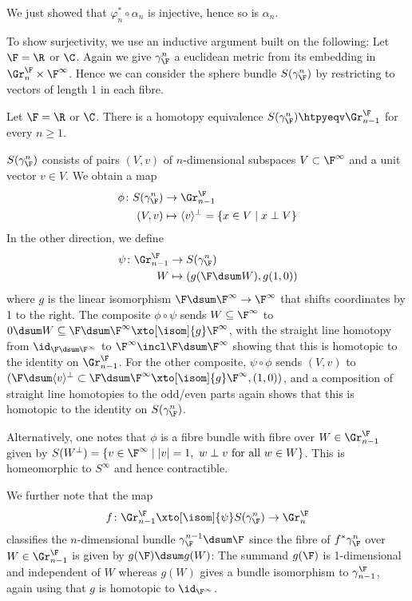\begin{smallproof}
	We just showed that $\varphi_n^* \circ \alpha_n$ is injective, hence so is $\alpha_n$.
\end{smallproof}
To show surjectivity, we use an inductive argument built on the following:
Let $\F = \R$ or $\C$.
Again we give $\gamma_\F^n$ a euclidean metric from its embedding in $\Gr_n^\F \times \F^\infty$.
Hence we can consider the sphere bundle $S(\gamma_\F^n)$ by restricting to vectors of length 1 in each fibre.
\begin{proposition}\label{prop:spherebdlhtpygrassmannian}
	Let $\F = \R$ or $\C$.
	There is a homotopy equivalence $S(\gamma_\F^n) \htpyeqv \Gr^\F_{n - 1}$ for every $n \geq 1$.
\end{proposition}
\begin{smallproof}
	$S(\gamma_\F^n)$ consists of pairs $(V, v)$ of $n$-dimensional subspaces $V \subset \F^\infty$ and a unit vector $v \in V$.
	We obtain a map
	\begin{align*}
		\phi\colon S(\gamma_\F^n) &\to \Gr^\F_{n - 1} \\
		(V, v) &\mapsto \langle v\rangle^\perp = \{x \in V \mid x \perp V\}
	\end{align*}
	In the other direction, we define
	\begin{align*}
		\psi\colon \Gr^\F_{n - 1} &\to S(\gamma_\F^n) \\
		W &\mapsto (g(\F \dsum W), g(1, 0))
	\end{align*}
	where $g$ is the linear isomorphism $\F \dsum \F^\infty \to \F^\infty$ that shifts coordinates by 1 to the right.
	The composite $\phi \circ \psi$ sends $W \subseteq \F^\infty$ to $0 \dsum W \subseteq \F \dsum \F^\infty \xto[\isom]{g} \F^\infty$, with the straight line homotopy from $\id_{\F \dsum \F^\infty}$ to $\F^\infty \incl \F \dsum \F^\infty$ showing that this is homotopic to the identity on $\Gr^\F_{n - 1}$.
	For the other composite, $\psi \circ \phi$ sends $(V, v)$ to $(\F \dsum \langle v \rangle^\perp \subset \F \dsum \F^\infty \xto[\isom]{g} \F^\infty, (1, 0))$, and a composition of straight line homotopies to the odd/even parts again shows that this is homotopic to the identity on $S(\gamma_\F^n)$.
\end{smallproof}
Alternatively, one notes that $\phi$ is a fibre bundle with fibre over $W \in \Gr^\F_{n - 1}$ given by $S(W^\perp) = \{v \in \F^\infty \mid |v| = 1,\ w \perp v \text{ for all } w \in W\}$.
This is homeomorphic to $S^\infty$ and hence contractible.

We further note that the map
\begin{equation*}
	f\colon \Gr^\F_{n - 1} \xto[\isom]{\psi} S(\gamma_\F^n) \to \Gr^\F_n
\end{equation*}
classifies the $n$-dimensional bundle $\gamma_\F^{n - 1} \dsum \F$ since the fibre of $f^* \gamma_\F^n$ over $W \in \Gr^\F_{n - 1}$ is given by $g(\F) \dsum g(W)$:
The summand $g(\F)$ is 1-dimensional and independent of $W$ whereas $g(W)$ gives a bundle isomorphism to $\gamma^\F_{n - 1}$, again using that $g$ is homotopic to $\id_{\F^\infty}$.

